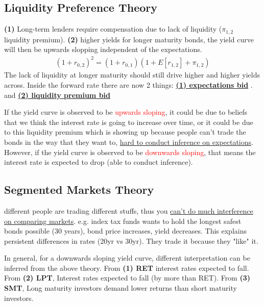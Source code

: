 \begin{multicols}{2}
\subsection{Liquidity Preference Theory}
\textbf{(1)} Long-term lenders require compensation due to lack of liquidity ($\pi_{1,2}$ liquidity premium). \textbf{(2)} higher yields for longer maturity bonds, the yield curve will then be upwards slopping independent of the expectations. 
\begin{gather*}
    (1+r_{0,2})^2 = (1+r_{0,1})(1+E[r_{1,2}]+\pi_{1,2})
\end{gather*}
The lack of liquidity at longer maturity should still drive higher and higher yields across. Inside the forward rate there are now 2 things: \underline{\textbf{(1) expectations bid}} . and \underline{\textbf{(2) liquidity premium bid}}




If the yield curve is observed to be \textcolor{red}{upwards sloping}, it could be due to beliefs that we think the interest rate is going to increase over time, or it could be due to this liquidity premium which is showing up because people can't trade the bonds in the way that they want to, \underline{hard to conduct inference on expectations}. However, if the yield curve is observed to be \textcolor{red}{downwards sloping}, that means the interest rate is expected to drop (able to conduct inference).
\subsection{Segmented Markets Theory}
different people are trading different stuffs, thus you \underline{can't do much interference on comparing markets}. e.g. index tax funds wants to hold the longest safest bonds possible (30 years), bond price increases, yield decreases. This explains persistent differences in rates (20yr vs 30yr). They trade it because they "like" it.\par

In general, for a downwards sloping yield curve, different interpretation can be inferred from the above theory. From \textbf{(1) RET} interest rates expected to fall. From \textbf{(2) LPT}, Interest rates expected to fall (by more than RET). From \textbf{(3) SMT}, Long maturity investors demand lower returns than short maturity investors.


\end{multicols}
